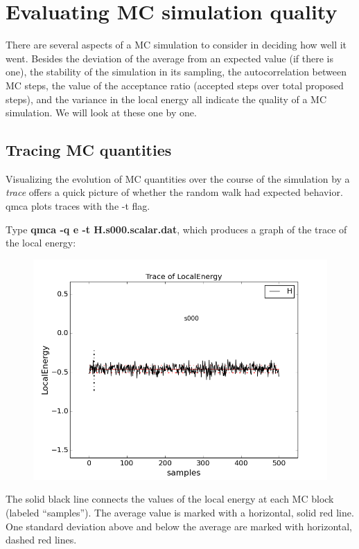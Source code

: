 \section{Evaluating MC simulation quality}

There are several aspects of a MC simulation to consider in deciding how well
it went.  Besides the deviation of the average from an expected value (if there
is one), the stability of the simulation in its sampling, the autocorrelation
between MC steps, the value of the acceptance ratio (accepted steps over total
proposed steps), and the variance in the local energy all indicate the quality
of a MC simulation.  We will look at these one by one.

\subsection{Tracing MC quantities}

Visualizing the evolution of MC quantities over the course of the simulation by
a \textit{trace} offers a quick picture of whether the random walk had expected
behavior.  qmca plots traces with the -t flag.

Type \textbf{qmca -q e -t H.s000.scalar.dat}, which produces a graph of the
trace of the local energy:

\FloatBarrier
\begin{figure}[ht!]
\begin{center}
\includegraphics[trim = 0mm 0mm 0mm 0mm, clip,width=0.75\columnwidth]{./figures/lab_qmc_statistics_tracing1}
\end{center}
\end{figure}
\FloatBarrier


The solid black line connects the values of the local energy at each MC block
(labeled ``samples'').  The average value is marked with a horizontal, solid
red line.  One standard deviation above and below the average are marked with
horizontal, dashed red lines.  

